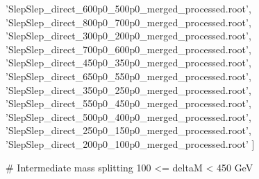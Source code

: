                       'SlepSlep_direct_600p0_500p0_merged_processed.root',
                      'SlepSlep_direct_800p0_700p0_merged_processed.root',
                      'SlepSlep_direct_300p0_200p0_merged_processed.root',
                      'SlepSlep_direct_700p0_600p0_merged_processed.root',
                      'SlepSlep_direct_450p0_350p0_merged_processed.root',
                      'SlepSlep_direct_650p0_550p0_merged_processed.root',
                      'SlepSlep_direct_350p0_250p0_merged_processed.root',
                      'SlepSlep_direct_550p0_450p0_merged_processed.root',
                      'SlepSlep_direct_500p0_400p0_merged_processed.root',
                      'SlepSlep_direct_250p0_150p0_merged_processed.root',
                      'SlepSlep_direct_200p0_100p0_merged_processed.root'
                      ]


# Intermediate mass splitting 100 <= deltaM < 450 GeV

